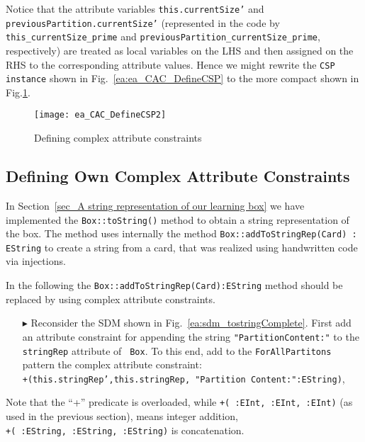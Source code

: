 Notice that the attribute variables \texttt{this.currentSize'} and \\
\texttt{previousPartition.currentSize'} (represented in the code by \\ 
\texttt{this\_currentSize\_prime} and \texttt{previousPartition\_currentSize\_prime}, respectively) are treated as local variables on the LHS and then assigned on the RHS to the corresponding attribute values.
Hence we might rewrite the \texttt{CSP instance} shown in Fig.~\ref{ea:ea_CAC_DefineCSP} to the more compact shown in Fig.\ref{ea:ea_CAC_DefineCSP2}.
\begin{figure}[htbp]
\begin{center}
  \texttt{[image: ea\_CAC\_DefineCSP2]}
  \caption{Defining complex attribute constraints}  
  \label{ea:ea_CAC_DefineCSP2}
\end{center}
\end{figure}

\subsection{Defining Own Complex Attribute Constraints}  
In Section~\ref{sec_A string representation of our learning box} we have implemented the \texttt{Box::toString()} method to obtain a string representation of the box. 
The method uses internally the method \texttt{Box::addToStringRep(Card) : EString} to create a string from a card, that was realized using handwritten code via injections.

In the following the \texttt{Box::addToStringRep(Card):EString} method should be replaced by using complex attribute constraints.

\begin{itemize}
  \item[$\blacktriangleright$] Reconsider the SDM shown in Fig.~\ref{ea:sdm_tostringComplete}. First add an attribute constraint for appending the string \texttt{"PartitionContent:"} to the \texttt{stringRep} attribute of \texttt{ Box}. To this end, add to the \texttt{ForAllPartitons} pattern the complex attribute constraint:\\
\hspace*{0.5cm} \texttt{\small +(this.stringRep',this.stringRep, "Partition Content:":EString)},\\
\end{itemize}  
Note that the ``+'' predicate is overloaded, while \texttt{\small +( :EInt, :EInt, :EInt)} (as used in the previous section), means integer addition, \\
  \texttt{\small +( :EString, :EString, :EString)} is concatenation.
   	  


